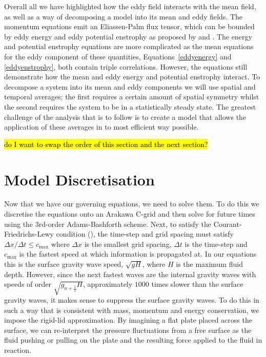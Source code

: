 \documentclass[12pt,a4paper]{report}
\newcommand*{\half}{\frac{1}{2}}
\begin{document}
            Overall all we have highlighted how the eddy field interacts with the mean
            field, as well as a way of decomposing a model into its mean and eddy fields.
            The momentum equations emit an Eliassen-Palm flux tensor, which can
            be bounded by eddy energy and eddy potential enstrophy as proposed
            by \cite{marshall2012framework} and \cite{maddison2013eliassen}. 
            The energy and potential enstrophy equations are more complicated
            as the mean equations for the eddy component of these quantities,
            Equations~\eqref{eddyenergy} and \eqref{eddyenstrophy}, both contain
            triple correlations. However, the equations still demonstrate how
            the mean and eddy energy and potential enstrophy interact.
            To decompose a system into its mean and eddy components we will
            use spatial and temporal averages; the first requires a certain
            amount of spatial symmetry whilst the second requires the system to be
            in a statistically steady state. The greatest challenge of the analysis
            that is to follow is to create a model that allows the application of 
            these averages in to most efficient way possible.
            
            
            
            \hl{do I want to swap the order of this section and the next section?}
                
    

\section{Model Discretisation}

Now that we have our governing equations, we need to solve them. To do this we
discretise the equations onto an Arakawa C-grid and then solve for future times
using the 3rd-order Adams-Bashforth scheme. Next, to satisfy the Courant-Friedrichs-Lewy
 condition (\cite{courant1928partiellen}), the time-step and grid spacing must satisfy ${\Delta x}/{\Delta t} \leq c_{\max}$ where $\Delta x$ is the smallest grid spacing, $\Delta t$ is
 the time-step and $c_{\max}$ is the fastest speed at which information is propagated at. 
 In our equations this is the surface gravity wave speed, $\sqrt{g H}$, where $H$ is the
 maximum fluid depth. However, since the next fastest waves are the internal gravity
  waves with speeds of order $\sqrt{g_{n+\half} H}$, approximately $1000$ times slower than the surface gravity waves, it makes sense to suppress the surface gravity
  waves. To do this in such a way that is consistent with mass, momentum and energy 
  conservation, we impose the rigid-lid approximation. By imagining a flat plate 
  placed across the surface, we can re-interpret the pressure fluctuations from a free
  surface as the fluid pushing or pulling on the plate and the resulting force 
  applied to the fluid in reaction. 
  
\end{document}

